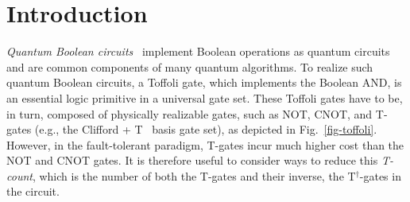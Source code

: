 
\section{Introduction}

{\it Quantum Boolean circuits}~\cite{bib-ddmf} implement Boolean operations as quantum circuits and
are common components of many quantum algorithms. To realize such quantum Boolean circuits,
a Toffoli gate, which implements the Boolean AND, is an essential logic primitive in a universal gate
set. These Toffoli gates have to be, in turn, composed of physically realizable gates, such as NOT,
CNOT, and T-gates (e.g., the Clifford + T~\cite{bib-barenco-elementary} basis gate set), as depicted
in Fig.~\ref{fig-toffoli}. However, in the fault-tolerant paradigm, T-gates incur much higher cost
than the NOT and CNOT gates. It is therefore useful to consider ways to reduce this {\it T-count},
which is the number of both the T-gates and their inverse, the T$^{\dagger}$-gates in the circuit.

